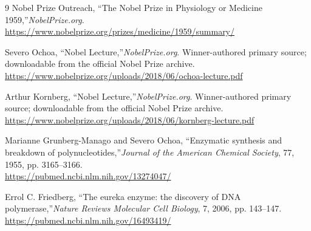 \begin{thebibliography}{9}
Nobel Prize Outreach, ``The Nobel Prize in Physiology or Medicine 1959,''\emph{NobelPrize.org}.\\
\url{https://www.nobelprize.org/prizes/medicine/1959/summary/}

Severo Ochoa, ``Nobel Lecture,''\emph{NobelPrize.org}. Winner-authored primary source; downloadable from the official Nobel Prize archive.\\
\url{https://www.nobelprize.org/uploads/2018/06/ochoa-lecture.pdf}

Arthur Kornberg, ``Nobel Lecture,''\emph{NobelPrize.org}. Winner-authored primary source; downloadable from the official Nobel Prize archive.\\
\url{https://www.nobelprize.org/uploads/2018/06/kornberg-lecture.pdf}

Marianne Grunberg-Manago and Severo Ochoa, ``Enzymatic synthesis and breakdown of polynucleotides,''\emph{Journal of the American Chemical Society}, 77, 1955, pp. 3165--3166.\\
\url{https://pubmed.ncbi.nlm.nih.gov/13274047/}

Errol C. Friedberg, ``The eureka enzyme: the discovery of DNA polymerase,''\emph{Nature Reviews Molecular Cell Biology}, 7, 2006, pp. 143--147.\\
\url{https://pubmed.ncbi.nlm.nih.gov/16493419/}
\end{thebibliography}
